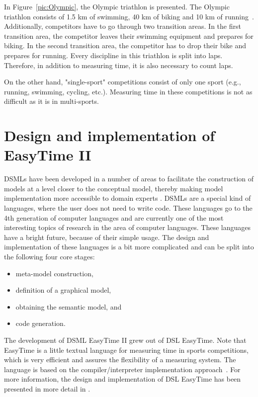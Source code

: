 \documentclass[preprint, prX]{revtex4}
\begin{document}
In Figure~\ref{pic:Olympic}, the Olympic triathlon is presented. The Olympic triathlon consists of 1.5 km of swimming, 40 km of biking and 10 km of running~\cite{IRONMAN-Austria}. Additionally, competitors have to go through two transition areas. In the first transition area, the competitor leaves their swimming equipment and prepares for biking. In the second transition area, the competitor has to drop their bike and prepares for running. Every discipline in this triathlon is split into laps. Therefore, in addition to measuring time, it is also necessary to count laps. 

On the other hand, "single-sport" competitions consist of only one sport (e.g., running, swimming, cycling, etc.). Measuring time in these competitions is not as difficult as it is in multi-sports.

\section{Design and implementation of EasyTime II}

DSMLs have been developed in a number of areas to facilitate the construction of models at a level closer to the conceptual model, thereby making model implementation more accessible to domain experts \cite{ecology}\cite{sprinkle1}\cite{GrayJ}\cite{Czarnecki}. DSMLs are a special kind of languages, where the user does not need to write code. These languages go to the 4th generation of computer languages and are currently one of the most interesting topics of research in the area of computer languages. These languages have a bright future, because of their simple usage. The design and implementation of these languages is a bit more complicated and can be split into the following four core stages: 
\begin{itemize}
\item meta-model construction,
\item definition of a graphical model,
\item obtaining the semantic model, and
\item code generation.
\end{itemize}
The development of DSML EasyTime II grew out of DSL EasyTime. Note that EasyTime is a little textual language for measuring time in sports competitions, which is very efficient and assures the flexibility of a measuring system. The language is based on the compiler/interpreter implementation approach~\cite{Kosar1}. For more information, the design and implementation of DSL EasyTime has been presented in more detail in \cite{Fister:2011}\cite{Fister:2011a}\cite{Fister:2012}. 
\end{document}

